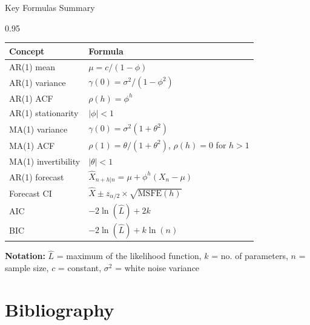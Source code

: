 \documentclass[9pt, aspectratio=169, t]{beamer}
\begin{document}
\begin{frame}{Key Formulas Summary}
    \begin{cminipage}{0.95\textwidth}
    \small
    \begin{center}
    \begin{tabular}{ll}
        \toprule
        \textbf{Concept} & \textbf{Formula} \\
        \midrule
        AR(1) mean & $\mu = c/(1-\phi)$ \\[0.1cm]
        AR(1) variance & $\gamma(0) = \sigma^2/(1-\phi^2)$ \\[0.1cm]
        AR(1) ACF & $\rho(h) = \phi^h$ \\[0.1cm]
        AR(1) stationarity & $|\phi| < 1$ \\[0.1cm]
        \midrule
        MA(1) variance & $\gamma(0) = \sigma^2(1+\theta^2)$ \\[0.1cm]
        MA(1) ACF & $\rho(1) = \theta/(1+\theta^2)$, $\rho(h) = 0$ for $h > 1$ \\[0.1cm]
        MA(1) invertibility & $|\theta| < 1$ \\[0.1cm]
        \midrule
        AR(1) forecast & $\hat{X}_{n+h|n} = \mu + \phi^h(X_n - \mu)$ \\[0.1cm]
        Forecast CI & $\hat{X} \pm z_{\alpha/2} \times \sqrt{\text{MSFE}(h)}$ \\[0.1cm]
        \midrule
        AIC & $-2\ln(\hat{L}) + 2k$ \\[0.1cm]
        BIC & $-2\ln(\hat{L}) + k\ln(n)$ \\
        \bottomrule
    \end{tabular}
    \end{center}

    {\scriptsize \textbf{Notation:} $\hat{L}$ = maximum of the likelihood function, $k$ = no. of parameters, $n$ = sample size, $c$ = constant, $\sigma^2$ = white noise variance}
    \end{cminipage}
\end{frame}

\section{Bibliography}
\end{document}
